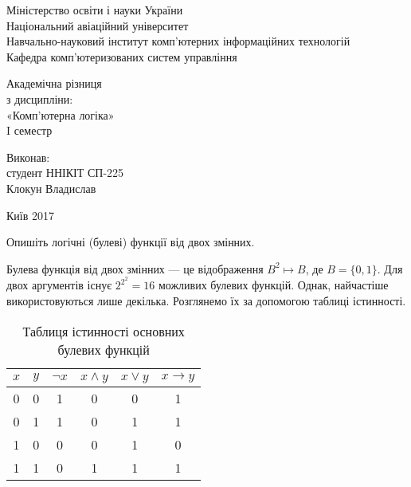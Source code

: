 \documentclass[a4paper,oneside,DIV=12,12pt]{scrartcl}
\renewcommand{\implies}{\rightarrow}
\begin{document}
	\begin{titlepage}
		\begin{center}
			Міністерство освіти і науки України\\
			Національний авіаційний університет\\
			Навчально-науковий інститут комп'ютерних інформаційних технологій\\
			Кафедра комп'ютеризованих систем управління
			
			\vspace{\fill}
				Академічна різниця\\
				з дисципліни:\\
				«Комп'ютерна логіка»\\
				I семестр
				
			\vspace{\fill}
			
			\begin{flushright}
				Виконав:\\
				студент ННІКІТ СП-225\\
				Клокун Владислав\\
			\end{flushright}
			Київ 2017
		\end{center}
	\end{titlepage}
	
	\begin{exercise}
		Опишіть логічні (булеві) функції від двох змінних.
	\end{exercise}
	
	\begin{solution}
		Булева функція від двох змінних --- це відображення $B^2 \mapsto B$, де $B = \{0, 1\}$. Для двох аргументів існує $2^{2^2} = 16$ можливих булевих функцій. Однак, найчастіше використовуються лише декілька. Розглянемо їх за допомогою таблиці істинності.
		
		\begin{table}[!htbp]
		\centering
			\begin{tabular}{cccccc}
				\toprule
					$x$ & $y$ & $\neg{x}$ & $x \land y$ & $x \lor y$ & $x \implies y$ \\
				\midrule
					0   & 0   & 1            & 0           & 0          & 1 \\
					0   & 1   & 1            & 0           & 1          & 1 \\
					1   & 0   & 0            & 0           & 1          & 0 \\
					1   & 1   & 0            & 1           & 1          & 1 \\
				\bottomrule
			\end{tabular}
		\caption{Таблиця істинності основних булевих функцій}
		\label{fig:bool-functioins-truth-table}
		\end{table}
	\end{solution}
	
\end{document}
